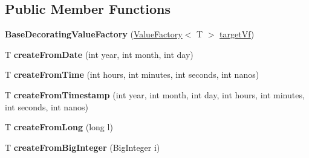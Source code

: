 \subsection*{Public Member Functions}
\begin{DoxyCompactItemize}
\item 
\mbox{\label{classcom_1_1mysql_1_1cj_1_1result_1_1_base_decorating_value_factory_adf77416836995015dd8a6f214749b8b4}} 
{\bfseries Base\+Decorating\+Value\+Factory} (\mbox{\hyperlink{interfacecom_1_1mysql_1_1cj_1_1result_1_1_value_factory}{Value\+Factory}}$<$ T $>$ \mbox{\hyperlink{classcom_1_1mysql_1_1cj_1_1result_1_1_base_decorating_value_factory_a64c2c62bd9906ec3af7fc62e58bf34b3}{target\+Vf}})
\item 
\mbox{\label{classcom_1_1mysql_1_1cj_1_1result_1_1_base_decorating_value_factory_a4c72385aed83cc4c020b79beabe53a5e}} 
T {\bfseries create\+From\+Date} (int year, int month, int day)
\item 
\mbox{\label{classcom_1_1mysql_1_1cj_1_1result_1_1_base_decorating_value_factory_a596f4a15a63fa7f42aa6116fc52f40aa}} 
T {\bfseries create\+From\+Time} (int hours, int minutes, int seconds, int nanos)
\item 
\mbox{\label{classcom_1_1mysql_1_1cj_1_1result_1_1_base_decorating_value_factory_a06ee3ccab4aaf494a1856920107134fc}} 
T {\bfseries create\+From\+Timestamp} (int year, int month, int day, int hours, int minutes, int seconds, int nanos)
\item 
\mbox{\label{classcom_1_1mysql_1_1cj_1_1result_1_1_base_decorating_value_factory_afac99d3f28348caf19dbd661c609fb9f}} 
T {\bfseries create\+From\+Long} (long l)
\item 
\mbox{\label{classcom_1_1mysql_1_1cj_1_1result_1_1_base_decorating_value_factory_aa9ea00497fa096349c600f09f54d2957}} 
T {\bfseries create\+From\+Big\+Integer} (Big\+Integer i)
\item 

\end{DoxyCompactItemize}
